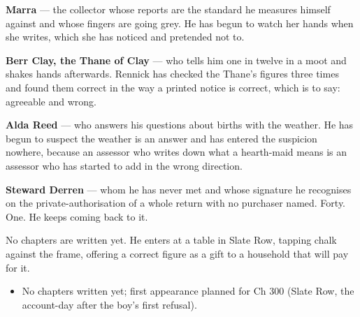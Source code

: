 \documentclass{design/chronicle}
\begin{document}
{\textbf{Marra} — the collector whose reports are the standard he measures himself against and whose fingers are going grey. He has begun to watch her hands when she writes, which she has noticed and pretended not to.

\textbf{Berr Clay, the Thane of Clay} — who tells him one in twelve in a moot and shakes hands afterwards. Rennick has checked the Thane’s figures three times and found them correct in the way a printed notice is correct, which is to say: agreeable and wrong.

\textbf{Alda Reed} — who answers his questions about births with the weather. He has begun to suspect the weather is an answer and has entered the suspicion nowhere, because an assessor who writes down what a hearth-maid means is an assessor who has started to add in the wrong direction.

\textbf{Steward Derren} — whom he has never met and whose signature he recognises on the private-authorisation of a whole return with no purchaser named. Forty. One. He keeps coming back to it.

No chapters are written yet. He enters at a table in Slate Row, tapping chalk against the frame, offering a correct figure as a gift to a household that will pay for it.

\begin{itemize}[leftmargin=1.4em,itemsep=1pt,topsep=3pt,parsep=0pt]

\item No chapters written yet; first appearance planned for Ch 300 (Slate Row, the account-day after the boy’s first refusal).

\end{itemize}
}
\end{document}
